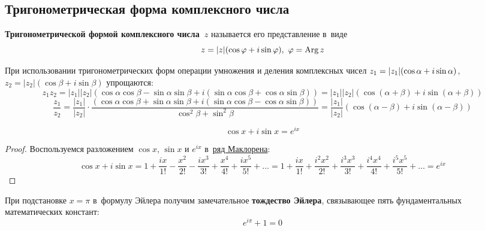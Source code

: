 \subsection{Тригонометрическая форма комплексного числа}
\textbf{Тригонометрической формой комплексного числа~$z$} называется его представление в~виде
\begin{equation*}
z = |z|(\cos \varphi + i\sin \varphi), \ \varphi = \operatorname{Arg} z
\end{equation*}

При использовании тригонометрических форм операции умножения и деления комплексных чисел
$z_1 = |z_1| \* (\cos \alpha + i\sin \alpha)$, $z_2 = |z_2|(\cos \beta + i\sin \beta)$ упрощаются:
\begin{equation*}
z_1 z_2 = |z_1| |z_2|(\cos \alpha \cos \beta - \sin \alpha \sin \beta + i(\sin \alpha \cos \beta + \cos \alpha \sin \beta)) =
|z_1| |z_2|(\cos (\alpha + \beta) + i\sin (\alpha + \beta))
\end{equation*}
\begin{equation*}
\frac{z_1}{z_2} = \frac{|z_1|}{|z_2|} \cdot
\frac{(\cos \alpha \cos \beta + \sin \alpha \sin \beta + i(\sin \alpha \cos \beta - \cos \alpha \sin \beta))}
{\cos^2 \beta + \sin^2 \beta} =
\frac{|z_1|}{|z_2|} (\cos (\alpha - \beta) + i\sin (\alpha - \beta))
\end{equation*}

\begin{theorem}
\begin{equation*}
\cos x + i\sin x = e^{ix}
\end{equation*}
\end{theorem}
\begin{proof}
Воспользуемся разложением $\cos x$, $\sin x$ и $e^{ix}$ в~\hyperref[eq:Maclaurin_series]{ряд Маклорена}:
\begin{equation*}
\cos x + i\sin x = 1 + \frac{ix}{1!} - \frac{x^2}{2!} - \frac{ix^3}{3!} + \frac{x^4}{4!} + \frac{ix^5}{5!} + \ldots =
1 + \frac{ix}{1!} + \frac{i^2 x^2}{2!} + \frac{i^3 x^3}{3!} + \frac{i^4 x^4}{4!} + \frac{i^5 x^5}{5!} + \ldots = e^{ix}
\end{equation*}
\end{proof}

При подстановке $x = \pi$ в~формулу Эйлера получим замечательное \textbf{тождество Эйлера}, связывающее пять фундаментальных математических констант:
\begin{equation*}
e^{i\pi} + 1 = 0
\end{equation*}

